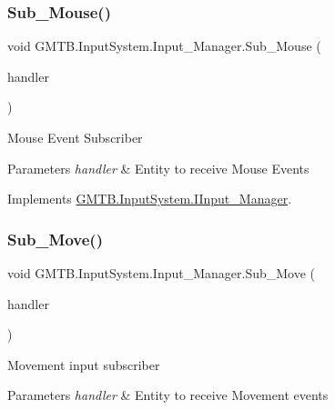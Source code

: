 \subsubsection{\texorpdfstring{Sub\_Mouse()}{Sub\_Mouse()}}
{\footnotesize\ttfamily void G\+M\+T\+B.\+Input\+System.\+Input\+\_\+\+Manager.\+Sub\+\_\+\+Mouse (\begin{DoxyParamCaption}\item[{Event\+Handler$<$ \mbox{\hyperlink{class_g_m_t_b_1_1_input_system_1_1_mouse_event}{Mouse\+Event}} $>$}]{handler }\end{DoxyParamCaption})}



Mouse Event Subscriber 


\begin{DoxyParams}{Parameters}
{\em handler} & Entity to receive Mouse Events \\
\hline
\end{DoxyParams}


Implements \mbox{\hyperlink{interface_g_m_t_b_1_1_input_system_1_1_i_input___manager_aa3ac395ab08cf7cf51506dec5a6f0936}{G\+M\+T\+B.\+Input\+System.\+I\+Input\+\_\+\+Manager}}.

\mbox{\label{class_g_m_t_b_1_1_input_system_1_1_input___manager_aa5c3ef995d84d51c4c8d13853b6f18d1}} 
\subsubsection{\texorpdfstring{Sub\_Move()}{Sub\_Move()}}
{\footnotesize\ttfamily void G\+M\+T\+B.\+Input\+System.\+Input\+\_\+\+Manager.\+Sub\+\_\+\+Move (\begin{DoxyParamCaption}\item[{Event\+Handler$<$ \mbox{\hyperlink{class_g_m_t_b_1_1_input_system_1_1_input_event}{Input\+Event}} $>$}]{handler }\end{DoxyParamCaption})}



Movement input subscriber 


\begin{DoxyParams}{Parameters}
{\em handler} & Entity to receive Movement events\\
\hline
\end{DoxyParams}


